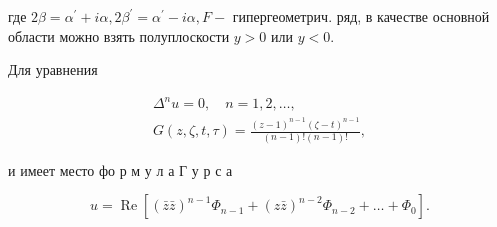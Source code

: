 \documentclass[10pt]{article}
\begin{document}
где $2 \beta=\alpha^{\prime}+i \alpha, 2 \beta^{\prime}=\alpha^{\prime}-i \alpha, F-$ гипергеометрич. ряд, в качестве основной области можно взять полуплоскости $y>0$ или $y<0$.



Для уравнения



\[

\begin{gathered}

\Delta^{n} u=0, \quad n=1,2, \ldots, \\

G(z, \zeta, t, \tau)=\frac{(z-1)^{n-1}(\zeta-t)^{n-1}}{(n-1) !(n-1) !},

\end{gathered}

\]



и имеет место фо р м у л а $Г$ у р с а



\[

u=\operatorname{Re}\left[(\bar{z} \bar{z})^{n-1} \Phi_{n-1}+(z \bar{z})^{n-2} \Phi_{n-2}+\ldots+\Phi_{0}\right] .

\]
\end{document}
